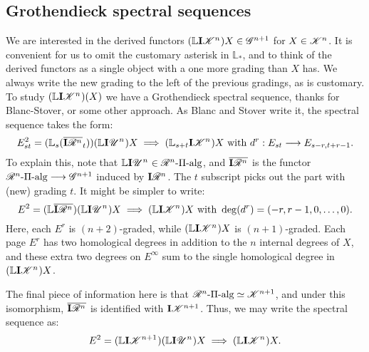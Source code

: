 \documentclass[11pt]{article}
\newcommand{\PRLie}[1]{\scrR^{#1}}%
\newcommand{\LL}[1]{{\scrK}^{#1}}%
\newcommand{\GR}[1]{\scrG^{#1}}%
\newcommand{\nontop}[1]{\scrU^{#1}}%
\newcommand{\PiAlg}[1]{#1\textup{-$\Pi$-alg}}
\newcommand{\restn}[1]{\xi{#1}}
\newcommand{\Ind}[2][]{\mathbf{I}{#2}_{#1}}%
\newcommand{\derived}{\mathbb{L}}
\newcommand{\LambdaOp}{\xi^{+}}
\begin{document}
\begin{DiagramOfFunctors}
\end{DiagramOfFunctors}
\begin{GrothendieckSpectralSequences}
\section*{Grothendieck spectral sequences}
We are interested in the derived functors $(\derived\Ind{\LL{n}})X\in\GR{n+1}$ for $X\in\LL{n}$. It is convenient for us to omit the customary asterisk in $\derived_*$, and to think of the derived functors as a single object with a one more grading than $X$ has. We always write the new grading to the left of the previous gradings, as is customary. To study $(\derived\Ind{\LL{n}})(X)$ we have a Grothendieck spectral sequence, thanks for Blanc-Stover, or some other approach. As Blanc and Stover write it, the spectral sequence takes the form:
\[E^2_{st}=(\derived_s(\overline{\Ind{\PRLie{n}}}_t))(\derived\Ind{\nontop{n}})X\implies(\derived_{s+t}\Ind{\LL{n}})X\textup{ with }d^{r}:E_{st}\to E_{s-r,t+r-1}.\]
To explain this, note that $\derived\Ind{\nontop{n}}\in\PiAlg{\PRLie{n}}$, and $\overline{\Ind{\PRLie{n}}}$ is the functor $\PiAlg{\PRLie{n}}\to\GR{n+1}$ induced by $\Ind{\PRLie{n}}$. The $t$ subscript picks out the part with (new) grading $t$. It might be simpler to write:
\[E^2=(\derived\overline{\Ind{\PRLie{n}}})(\derived\Ind{\nontop{n}})X\implies(\derived\Ind{\LL{n}})X\textup{ with }\deg(d^r)=(-r,r-1,0,\ldots,0).\]
Here, each $E^r$ is $(n+2)$-graded, while $(\derived\Ind{\LL{n}})X$ is $(n+1)$-graded. Each page $E^r$ has two homological degrees in addition to the $n$ internal degrees of $X$, and these extra two degrees on $E^\infty$ sum to the single homological degree in $(\derived\Ind{\LL{n}})X$.

The final piece of information here is that $\PiAlg{\PRLie{n}}\simeq\LL{n+1}$, and under this isomorphism, $\overline{\Ind{\PRLie{n}}}$ is identified with $\Ind{\LL{n+1}}$. Thus, we may write the spectral sequence as:
\[E^2=(\derived{\Ind{\LL{n+1}}})(\derived\Ind{\nontop{n}})X\implies(\derived\Ind{\LL{n}})X.\]
\end{GrothendieckSpectralSequences}
\end{document}

